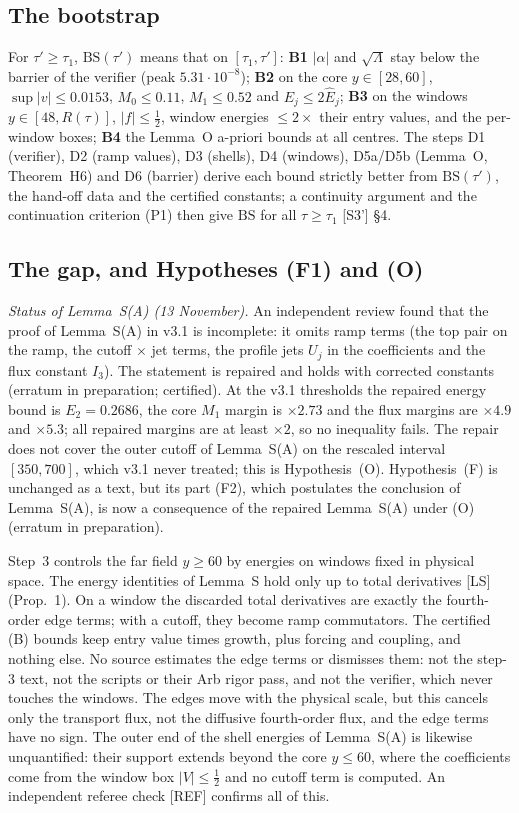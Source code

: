 \documentclass[11pt]{amsart}
\theoremstyle{definition}
\theoremstyle{remark}
\newcommand{\Lam}{\Lambda}
\newcommand{\dref}[1]{[\textsf{#1}]}
\begin{document}
\subsection{The bootstrap}\label{ss:boot}
For $\tau'\ge\tau_1$, $\mathrm{BS}(\tau')$ means that on $[\tau_1,\tau']$: \textbf{B1} $|\alpha|$ and $\sqrt\Lam$ stay below the barrier of the verifier (peak $5.31\cdot10^{-8}$); \textbf{B2} on the core $y\in[28,60]$, $\sup|v|\le0.0153$, $M_0\le0.11$, $M_1\le0.52$ and $E_j\le2\hat E_j$; \textbf{B3} on the windows $y\in[48,R(\tau)]$, $|f|\le\frac12$, window energies $\le2\times$ their entry values, and the per-window boxes; \textbf{B4} the Lemma~O a-priori bounds at all centres. The steps D1 (verifier), D2 (ramp values), D3 (shells), D4 (windows), D5a/D5b (Lemma~O, Theorem~H6) and D6 (barrier) derive each bound strictly better from $\mathrm{BS}(\tau')$, the hand-off data and the certified constants; a continuity argument and the continuation criterion (P1) then give $\mathrm{BS}$ for all $\tau\ge\tau_1$ \dref{S3'} \S4.

\subsection{The gap, and Hypotheses (F1) and (O)}\label{ss:gap}
\emph{Status of Lemma~S(A) (13 November).} An independent review found that the proof of Lemma~S(A) in v3.1 is incomplete: it omits ramp terms (the top pair on the ramp, the cutoff $\times$ jet terms, the profile jets $U_j$ in the coefficients and the flux constant $I_3$). The statement is repaired and holds with corrected constants (erratum in preparation; certified). At the v3.1 thresholds the repaired energy bound is $E_2=0.2686$, the core $M_1$ margin is $\times2.73$ and the flux margins are $\times4.9$ and $\times5.3$; all repaired margins are at least $\times2$, so no inequality fails. The repair does not cover the outer cutoff of Lemma~S(A) on the rescaled interval $[350,700]$, which v3.1 never treated; this is Hypothesis~(O). Hypothesis~(F) is unchanged as a text, but its part (F2), which postulates the conclusion of Lemma~S(A), is now a consequence of the repaired Lemma~S(A) under (O) (erratum in preparation).


Step~3 controls the far field $y\ge60$ by energies on windows fixed in physical space. The energy identities of Lemma~S hold only up to total derivatives \dref{LS} (Prop.~1). On a window the discarded total derivatives are exactly the fourth-order edge terms; with a cutoff, they become ramp commutators. The certified (B) bounds keep entry value times growth, plus forcing and coupling, and nothing else. No source estimates the edge terms or dismisses them: not the step-3 text, not the scripts or their Arb rigor pass, and not the verifier, which never touches the windows. The edges move with the physical scale, but this cancels only the transport flux, not the diffusive fourth-order flux, and the edge terms have no sign. The outer end of the shell energies of Lemma~S(A) is likewise unquantified: their support extends beyond the core $y\le60$, where the coefficients come from the window box $|V|\le\frac12$ and no cutoff term is computed. An independent referee check \dref{REF} confirms all of this.
\end{document}
